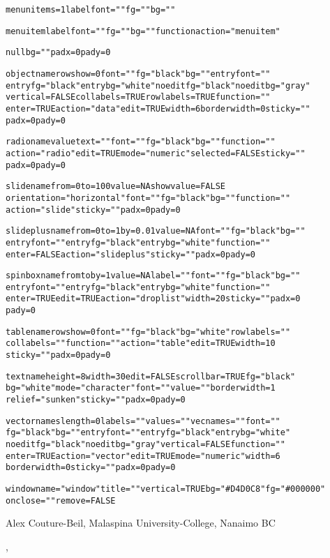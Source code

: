 \documentclass[letterpaper]{book}
\begin{document}
\begin{Details}
\begin{alltt}
menu nitems=1 label font="" fg="" bg=""

menuitem label font="" fg="" bg="" function action="menuitem"

null bg="" padx=0 pady=0

object name rowshow=0 font="" fg="black" bg="" entryfont=""
   entryfg="black" entrybg="white" noeditfg="black" noeditbg="gray"
   vertical=FALSE collabels=TRUE rowlabels=TRUE function=""
   enter=TRUE action="data" edit=TRUE width=6 borderwidth=0 sticky=""
   padx=0 pady=0

radio name value text="" font="" fg="black" bg="" function=""
   action="radio" edit=TRUE mode="numeric" selected=FALSE sticky=""
   padx=0 pady=0

slide name from=0 to=100 value=NA showvalue=FALSE
   orientation="horizontal" font="" fg="black" bg="" function=""
   action="slide" sticky="" padx=0 pady=0

slideplus name from=0 to=1 by=0.01 value=NA font="" fg="black" bg=""
   entryfont="" entryfg="black" entrybg="white" function=""
   enter=FALSE action="slideplus" sticky="" padx=0 pady=0

spinbox name from to by=1 value=NA label="" font="" fg="black" bg=""
   entryfont="" entryfg="black" entrybg="white" function=""
   enter=TRUE edit=TRUE action="droplist" width=20 sticky="" padx=0
   pady=0

table name rowshow=0 font="" fg="black" bg="white" rowlabels=""
   collabels="" function="" action="table" edit=TRUE width=10
   sticky="" padx=0 pady=0

text name height=8 width=30 edit=FALSE scrollbar=TRUE fg="black"
   bg="white" mode="character" font="" value="" borderwidth=1
   relief="sunken" sticky="" padx=0 pady=0

vector names length=0 labels="" values="" vecnames="" font=""
   fg="black" bg="" entryfont="" entryfg="black" entrybg="white"
   noeditfg="black" noeditbg="gray" vertical=FALSE function=""
   enter=TRUE action="vector" edit=TRUE mode="numeric" width=6
   borderwidth=0 sticky="" padx=0 pady=0

window name="window" title="" vertical=TRUE bg="\#D4D0C8" fg="\#000000"
   onclose="" remove=FALSE

\end{alltt}
\end{Details}
\begin{Author}\relax
Alex Couture-Beil, Malaspina University-College, Nanaimo BC
\end{Author}
\begin{SeeAlso}\relax
{}, 
\end{SeeAlso}
\end{document}

